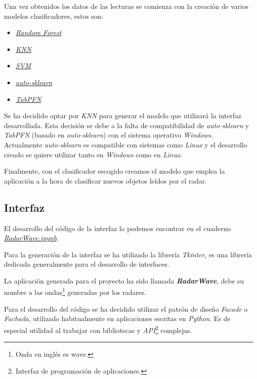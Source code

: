 Una vez obtenidos los datos de las lecturas se comienza con la creación de varios modelos clasificadores, estos son:
\begin{itemize}
\item \href{https://github.com/mecyc/TFG_RADAR_60GHZ/blob/main/scripts/RandomForest.ipynb}{\textit{Random Forest}}
\item \href{https://github.com/mecyc/TFG_RADAR_60GHZ/blob/main/scripts/KNN.ipynb}{\textit{KNN}}
\item \href{https://github.com/mecyc/TFG_RADAR_60GHZ/blob/main/scripts/GridSearchCV\%20(SVM).ipynb}{\textit{SVM}}
\item \href{https://github.com/mecyc/TFG_RADAR_60GHZ/blob/main/scripts/Auto-Sklearn.ipynb}{\textit{auto-sklearn}}
\item \href{https://github.com/mecyc/TFG_RADAR_60GHZ/blob/main/scripts/TabPFN.ipynb}{\textit{TabPFN}}
\end{itemize}

Se ha decidido optar por \textit{KNN} para generar el modelo que utilizará la interfaz desarrollada. Esta decisión se debe a la falta de compatibilidad de \textit{auto-sklearn} y \textit{TabPFN} (basado en \textit{auto-sklearn}) con el sistema operativo \textit{Windows}. Actualmente \textit{auto-sklearn} es compatible con sistemas como \textit{Linux} y el desarrollo creado se quiere utilizar tanto en \textit{Windows} como en \textit{Linux}.

Finalmente, con el clasificador escogido creamos el modelo que emplea la aplicación a la hora de clasificar nuevos objetos leídos por el radar.

\subsection{Interfaz}

El desarrollo del código de la interfaz lo podemos encontrar en el cuaderno \href{https://github.com/mecyc/TFG_RADAR_60GHZ/blob/main/scripts/RadarWave.ipynb}{\textit{RadarWave.ipynb}}.

Para la generación de la interfaz se ha utilizado la librería \textit{Tkinter}, es una librería dedicada generalmente para el desarrollo de interfaces.

La aplicación generada para el proyecto ha sido llamada \textit{\textbf{RadarWave}}, debe su nombre a las ondas\footnote{Onda en inglés es wave.} generadas por los radares.

Para el desarrollo del código se ha decidido utilizar el patrón de diseño \textit{Facade}\cite{Facade} o \textit{Fachada}, utilizado habitualmente en aplicaciones escritas en \textit{Python}. Es de especial utilidad al trabajar con bibliotecas y \textit{API}\footnote{Interfaz de programación de aplicaciones.} complejas.


